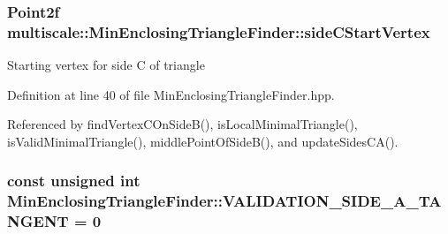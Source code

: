 \hypertarget{classmultiscale_1_1MinEnclosingTriangleFinder_a877d0c34c4803643699d8fd176c24d4e}{
\subsubsection[{side\-C\-Start\-Vertex}]{\setlength{\rightskip}{0pt plus 5cm}\-Point2f {\bf multiscale\-::\-Min\-Enclosing\-Triangle\-Finder\-::side\-C\-Start\-Vertex}}}\label{classmultiscale_1_1MinEnclosingTriangleFinder_a877d0c34c4803643699d8fd176c24d4e}
\-Starting vertex for side \-C of triangle 

\-Definition at line 40 of file \-Min\-Enclosing\-Triangle\-Finder.\-hpp.



\-Referenced by find\-Vertex\-C\-On\-Side\-B(), is\-Local\-Minimal\-Triangle(), is\-Valid\-Minimal\-Triangle(), middle\-Point\-Of\-Side\-B(), and update\-Sides\-C\-A().

\hypertarget{classmultiscale_1_1MinEnclosingTriangleFinder_a811859188bd18d46ee6906ad4d958b3a}{
\subsubsection[{\-V\-A\-L\-I\-D\-A\-T\-I\-O\-N\-\_\-\-S\-I\-D\-E\-\_\-\-A\-\_\-\-T\-A\-N\-G\-E\-N\-T}]{\setlength{\rightskip}{0pt plus 5cm}const unsigned int {\bf \-Min\-Enclosing\-Triangle\-Finder\-::\-V\-A\-L\-I\-D\-A\-T\-I\-O\-N\-\_\-\-S\-I\-D\-E\-\_\-\-A\-\_\-\-T\-A\-N\-G\-E\-N\-T} = 0}}\label{classmultiscale_1_1MinEnclosingTriangleFinder_a811859188bd18d46ee6906ad4d958b3a}


